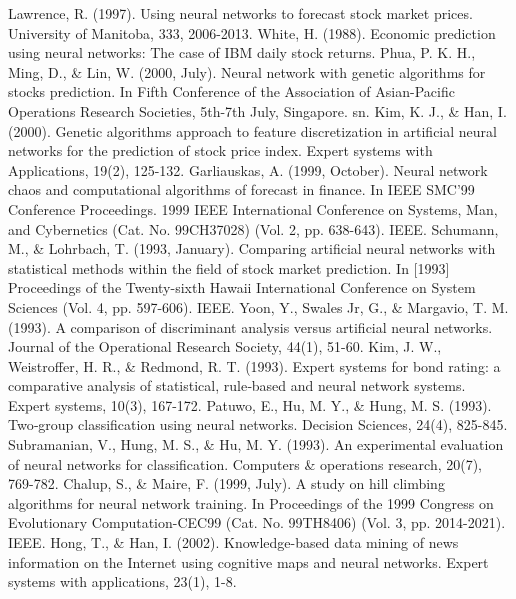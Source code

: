 \documentclass[a4paper,12pt]{report}
\begin{document}
\begin{fig}
\newpage

%
%
\begin{thebibliography}{9}
	Lawrence, R. (1997). Using neural networks to forecast stock market prices. University of Manitoba, 333, 2006-2013.
	White, H. (1988). Economic prediction using neural networks: The case of IBM daily stock returns.
	Phua, P. K. H., Ming, D., \& Lin, W. (2000, July). Neural network with genetic algorithms for stocks prediction. In Fifth Conference of the Association of Asian-Pacific Operations Research Societies, 5th-7th July, Singapore. sn.
	Kim, K. J., \& Han, I. (2000). Genetic algorithms approach to feature discretization in artificial neural networks for the prediction of stock price index. Expert systems with Applications, 19(2), 125-132.
	Garliauskas, A. (1999, October). Neural network chaos and computational algorithms of forecast in finance. In IEEE SMC'99 Conference Proceedings. 1999 IEEE International Conference on Systems, Man, and Cybernetics (Cat. No. 99CH37028) (Vol. 2, pp. 638-643). IEEE.
	Schumann, M., \& Lohrbach, T. (1993, January). Comparing artificial neural networks with statistical methods within the field of stock market prediction. In [1993] Proceedings of the Twenty-sixth Hawaii International Conference on System Sciences (Vol. 4, pp. 597-606). IEEE.
	Yoon, Y., Swales Jr, G., \& Margavio, T. M. (1993). A comparison of discriminant analysis versus artificial neural networks. Journal of the Operational Research Society, 44(1), 51-60.
	Kim, J. W., Weistroffer, H. R., \& Redmond, R. T. (1993). Expert systems for bond rating: a comparative analysis of statistical, rule‐based and neural network systems. Expert systems, 10(3), 167-172.
	Patuwo, E., Hu, M. Y., \& Hung, M. S. (1993). Two‐group classification using neural networks. Decision Sciences, 24(4), 825-845.
	Subramanian, V., Hung, M. S., \& Hu, M. Y. (1993). An experimental evaluation of neural networks for classification. Computers \& operations research, 20(7), 769-782.
	Chalup, S., \& Maire, F. (1999, July). A study on hill climbing algorithms for neural network training. In Proceedings of the 1999 Congress on Evolutionary Computation-CEC99 (Cat. No. 99TH8406) (Vol. 3, pp. 2014-2021). IEEE.
	Hong, T., \& Han, I. (2002). Knowledge-based data mining of news information on the Internet using cognitive maps and neural networks. Expert systems with applications, 23(1), 1-8.

\end{thebibliography}
\end{fig}
\end{document}
